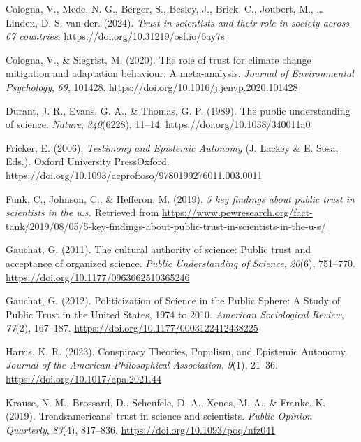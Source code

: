 \documentclass[
  doc,floatsintext]{apa6}
\newlength{\cslhangindent}
\newenvironment{CSLReferences}[2] %
 {\begin{list}{}{%
  \setlength{\itemindent}{0pt}
  \setlength{\leftmargin}{0pt}
  \setlength{\parsep}{0pt}
  \ifodd #1
   \setlength{\leftmargin}{\cslhangindent}
   \setlength{\itemindent}{-1\cslhangindent}
  \fi
  \setlength{\itemsep}{#2\baselineskip}}}
 {\end{list}}
\begin{document}
\begin{CSLReferences}{1}{0}
Cologna, V., Mede, N. G., Berger, S., Besley, J., Brick, C., Joubert, M., \ldots{} Linden, D. S. van der. (2024). \emph{Trust in scientists and their role in society across 67 countries}. \url{https://doi.org/10.31219/osf.io/6ay7s}

Cologna, V., \& Siegrist, M. (2020). The role of trust for climate change mitigation and adaptation behaviour: A meta-analysis. \emph{Journal of Environmental Psychology}, \emph{69}, 101428. \url{https://doi.org/10.1016/j.jenvp.2020.101428}

Durant, J. R., Evans, G. A., \& Thomas, G. P. (1989). The public understanding of science. \emph{Nature}, \emph{340}(6228), 11--14. \url{https://doi.org/10.1038/340011a0}

Fricker, E. (2006). \emph{Testimony and Epistemic Autonomy} (J. Lackey \& E. Sosa, Eds.). Oxford University PressOxford. \url{https://doi.org/10.1093/acprof:oso/9780199276011.003.0011}

Funk, C., Johnson, C., \& Hefferon, M. (2019). \emph{5 key findings about public trust in scientists in the u.s.} Retrieved from \url{https://www.pewresearch.org/fact-tank/2019/08/05/5-key-findings-about-public-trust-in-scientists-in-the-u-s/}

Gauchat, G. (2011). The cultural authority of science: Public trust and acceptance of organized science. \emph{Public Understanding of Science}, \emph{20}(6), 751--770. \url{https://doi.org/10.1177/0963662510365246}

Gauchat, G. (2012). Politicization of Science in the Public Sphere: A Study of Public Trust in the United States, 1974 to 2010. \emph{American Sociological Review}, \emph{77}(2), 167--187. \url{https://doi.org/10.1177/0003122412438225}

Harris, K. R. (2023). Conspiracy Theories, Populism, and Epistemic Autonomy. \emph{Journal of the American Philosophical Association}, \emph{9}(1), 21--36. \url{https://doi.org/10.1017/apa.2021.44}

Krause, N. M., Brossard, D., Scheufele, D. A., Xenos, M. A., \& Franke, K. (2019). Trends{\textemdash}americans{'} trust in science and scientists. \emph{Public Opinion Quarterly}, \emph{83}(4), 817--836. \url{https://doi.org/10.1093/poq/nfz041}


\end{CSLReferences}
\end{document}

